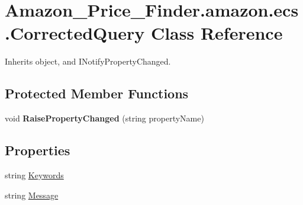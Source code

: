 \hypertarget{class_amazon___price___finder_1_1amazon_1_1ecs_1_1_corrected_query}{\section{Amazon\-\_\-\-Price\-\_\-\-Finder.\-amazon.\-ecs.\-Corrected\-Query Class Reference}
\label{class_amazon___price___finder_1_1amazon_1_1ecs_1_1_corrected_query}
}


 




Inherits object, and I\-Notify\-Property\-Changed.

\subsection*{Protected Member Functions}
\begin{DoxyCompactItemize}
\item 
\hypertarget{class_amazon___price___finder_1_1amazon_1_1ecs_1_1_corrected_query_ab36b3f43af5fc847b20ee985e8b5e2e5}{void {\bfseries Raise\-Property\-Changed} (string property\-Name)}\label{class_amazon___price___finder_1_1amazon_1_1ecs_1_1_corrected_query_ab36b3f43af5fc847b20ee985e8b5e2e5}

\end{DoxyCompactItemize}
\subsection*{Properties}
\begin{DoxyCompactItemize}
\item 
\hypertarget{class_amazon___price___finder_1_1amazon_1_1ecs_1_1_corrected_query_aff7425da309dad7739dd42ba0db6ed57}{string \hyperlink{class_amazon___price___finder_1_1amazon_1_1ecs_1_1_corrected_query_aff7425da309dad7739dd42ba0db6ed57}{Keywords}}\label{class_amazon___price___finder_1_1amazon_1_1ecs_1_1_corrected_query_aff7425da309dad7739dd42ba0db6ed57}

\begin{DoxyCompactList}\small\item\em \end{DoxyCompactList}\item 
\hypertarget{class_amazon___price___finder_1_1amazon_1_1ecs_1_1_corrected_query_a48d87030e044ed4e7a3a1648f16449ff}{string \hyperlink{class_amazon___price___finder_1_1amazon_1_1ecs_1_1_corrected_query_a48d87030e044ed4e7a3a1648f16449ff}{Message}}\label{class_amazon___price___finder_1_1amazon_1_1ecs_1_1_corrected_query_a48d87030e044ed4e7a3a1648f16449ff}

\begin{DoxyCompactList}\small\item\em \end{DoxyCompactList}\end{DoxyCompactItemize}
